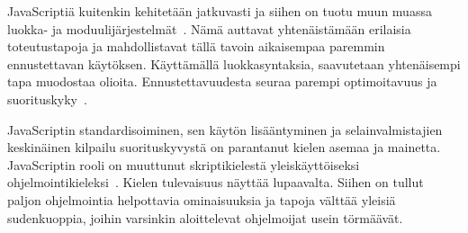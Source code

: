 JavaScriptiä kuitenkin kehitetään jatkuvasti ja siihen on tuotu muun muassa luokka- ja moduulijärjestelmät~\cite[14.5.~ja~15.2.]{es6}. Nämä auttavat yhtenäistämään erilaisia toteutustapoja ja mahdollistavat tällä tavoin aikaisempaa paremmin ennustettavan käytöksen. Käyttämällä luokkasyntaksia, saavutetaan yhtenäisempi tapa muodostaa olioita. Ennustettavuudesta seuraa parempi optimoitavuus ja suorituskyky~\cite[s.~497]{Ahn2014}.

JavaScriptin standardisoiminen, sen käytön lisääntyminen ja selainvalmistajien keskinäinen kilpailu suorituskyvystä on parantanut kielen asemaa ja mainetta. JavaScriptin rooli on muuttunut skriptikielestä yleiskäyttöiseksi ohjelmointikieleksi~\cite[4.]{es6}. Kielen tulevaisuus näyttää lupaavalta. Siihen on tullut paljon ohjelmointia helpottavia ominaisuuksia ja tapoja välttää yleisiä sudenkuoppia, joihin varsinkin aloittelevat ohjelmoijat usein törmäävät.